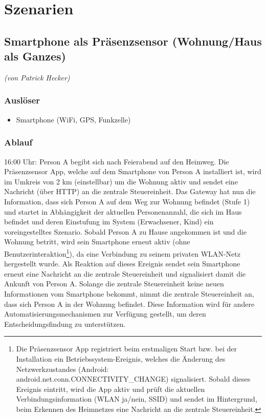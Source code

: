 
\chapter{Szenarien}
\label{chap:szenarien}

\section{Smartphone als Präsenzsensor (Wohnung/Haus als Ganzes)}
\emph{(von Patrick Hecker)}

\subsection{Auslöser}
\begin{itemize}
	\item Smartphone (WiFi, GPS, Funkzelle)
\end{itemize}

\subsection{Ablauf}
16:00 Uhr: Person A begibt sich nach Feierabend auf den Heimweg. Die Präsenzsensor App, welche auf dem Smartphone von Person A installiert ist, wird im Umkreis von 2 km (einstellbar) um die Wohnung aktiv und sendet eine Nachricht (über HTTP) an die zentrale Steuereinheit. Das Gateway hat nun die Information, dass sich Person A auf dem Weg zur Wohnung befindet (Stufe 1) und startet in Abhängigkeit der aktuellen Personenanzahl, die sich im Haus befindet und deren Einstufung im System (Erwachsener, Kind) ein voreingestelltes Szenario. Sobald Person A zu Hause angekommen ist und die Wohnung betritt, wird sein Smartphone erneut aktiv (ohne Benutzerinteraktion\footnote{Die Präsenzsensor App registriert beim erstmaligen Start bzw. bei der Installation ein Betriebssystem-Ereignis, welches die Änderung des Netzwerkzustandes (Android: android.net.conn.CONNECTIVITY\_CHANGE) signalisiert. Sobald dieses Ereignis eintritt, wird die App aktiv und prüft die aktuellen Verbindungsinformation (WLAN ja/nein, SSID) und sendet im Hintergrund, beim Erkennen des Heimnetzes eine Nachricht an die zentrale Steuereinheit.}), da eine Verbindung zu seinem privaten WLAN-Netz hergestellt wurde. Als Reaktion auf dieses Ereignis sendet sein Smartphone erneut eine Nachricht an die zentrale Steuereinheit und signalisiert damit die Ankunft von Person A. Solange die zentrale Steuereinheit keine neuen Informationen vom Smartphone bekommt, nimmt die zentrale Steuereinheit an, dass sich Person A in der Wohnung befindet. Diese Information wird für andere Automatisierungsmechanismen zur Verfügung gestellt, um deren Entscheidungsfindung zu unterstützen.

